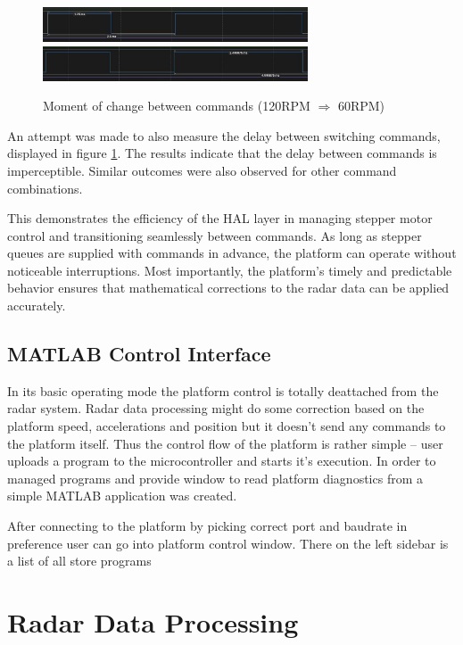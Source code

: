 \begin{figure}[h!]
	\centering
	\includegraphics[width=0.7\textwidth]{../img/120rpm_to60_1.jpg}
	\includegraphics[width=0.7\textwidth]{../img/120rpm_to60_2.jpg}
	\caption[Moment of change between commands with 120RPM and 60RPM]{Moment of change between commands (120RPM $\Rightarrow$  60RPM)}
	\label{fig:switching}
\end{figure}

An attempt was made to also measure the delay  between switching commands, displayed in figure \ref{fig:switching}.
The results indicate that the delay between commands is imperceptible.
Similar outcomes were also observed for other command combinations.

This demonstrates the efficiency of the HAL layer in managing stepper motor control and transitioning seamlessly between commands.
As long as stepper queues are supplied with commands in advance, the platform can operate without noticeable interruptions.
Most importantly, the platform’s timely and predictable behavior ensures that mathematical corrections to the radar data can be applied accurately.

\section{MATLAB Control Interface}

In its basic operating mode the platform control is totally deattached from the radar system.
Radar data processing might do some correction based on the platform speed, accelerations and position but it doesn't send any commands to the platform itself.
Thus the control flow of the platform is rather simple -- user uploads a program to the microcontroller and starts it's execution.
In order to managed programs and provide window to read platform diagnostics from a simple MATLAB application was created.

After connecting to the platform by picking correct port and baudrate in preference user can go into platform control window.
There on the left sidebar is a list of all store programs



\chapter{Radar Data Processing}






\listoffigures

\listoftables

\clearpage
\openright


